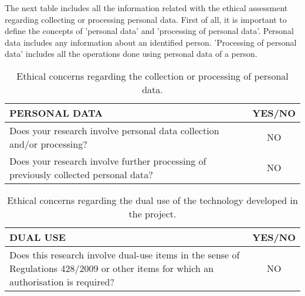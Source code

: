 \vspace{-0.5cm}
The next table includes all the information related with the ethical assessment regarding collecting or processing personal data. First of all, it is important to define the concepts of 'personal data' and 'processing of personal data'. Personal data includes any information about an identified person. 'Processing of personal data' includes all the operations done using personal data of a person.\\

\begin{table}[H]
	\centering
	\begin{tabular}[H]{ p{12.6cm} c }
		
		\toprule[2pt]
		
		\textbf{PERSONAL DATA} & \textbf{YES/NO} \\
		
		\midrule[1.5pt]
		
		Does your research involve personal data collection and/or processing?\vspace{0.2cm} & NO \\
		
		Does your research involve further processing of previously collected personal data?\vspace{0.1cm} & NO \\
		
	    \bottomrule[2pt]
	    	
	\end{tabular}
	\caption[Ethics - Personal data]{Ethical concerns regarding the collection or processing of personal data.}
	\label{Ethics_personaldata}
\end{table}



\begin{table}[H]
	\centering
	\begin{tabular}[H]{ p{12.6cm} c }
		
		\toprule[2pt]
		
		\textbf{DUAL USE} & \textbf{YES/NO} \\
		
		\midrule[1.5pt]
		
		Does this research involve dual-use items in the sense of Regulations 428/2009 or other items for which an authorisation is required?\vspace{0.1cm} & NO\\
		
		\bottomrule[2pt]	
			
	\end{tabular}
	\caption[Ethics - Dual use]{Ethical concerns regarding the dual use of the technology developed in the project.}
	\label{Ethics_Dualuse}
\end{table}




